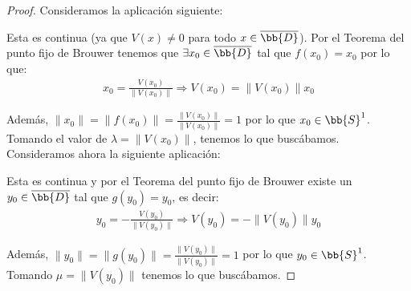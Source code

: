 \begin{coro}
    \begin{proof}
        Consideramos la aplicación siguiente:
        
        Esta es continua (ya que $V(x)\neq 0$ para todo $x\in \overline{{\bb{D}}}$). Por el Teorema del punto fijo de Brouwer tenemos que $\exists x_0\in \overline{\bb{D}}$ tal que $f(x_0) = x_0$ por lo que:
        \begin{gather*}
            x_0 = \frac{V(x_0)}{\|V(x_0)\|} \Longrightarrow V(x_0) = \|V(x_0)\|x_0
        \end{gather*}

        Además, $\|x_0\|=\|f(x_0)\|=\frac{\|V(x_0)\|}{\|V(x_0)\|}=1$ por lo que $x_0\in \bb{S}^1$. Tomando el valor de $\lambda = \|V(x_0)\|$, tenemos lo que buscábamos. Consideramos ahora la siguiente aplicación:

        Esta es continua y por el Teorema del punto fijo de Brouwer existe un $y_0\in \overline{\bb{D}}$ tal que $g(y_0) = y_0$, es decir:
        \begin{gather*}
            y_0 = - \frac{V(y_0)}{\|V(y_0)\|} \Longrightarrow V(y_0) = -\|V(y_0)\|y_0
        \end{gather*}
        
        Además, $\|y_0\|=\|g(y_0)\|=\frac{\|V(y_0)\|}{\|V(y_0)\|}=1$ por lo que $y_0\in \bb{S}^1$. Tomando $\mu = \|V(y_0)\|$ tenemos lo que buscábamos.
    \end{proof}
\end{coro}

